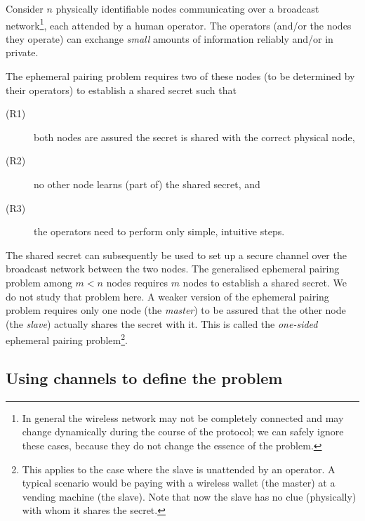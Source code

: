\documentclass[runningheads,envcountsame,envcountsect,oribibl]{llncs}
\begin{document}
Consider $n$ physically identifiable nodes communicating over a broadcast
network\footnote{
  In general the wireless network may not be completely connected and may
  change dynamically during the course of the protocol; we can safely ignore
  these cases, because they do not change the essence of the problem.
}, each attended by a human operator. The operators (and/or the nodes they
operate) can exchange \emph{small} amounts of information reliably and/or in
private. 

The ephemeral pairing problem requires
two of these nodes (to be determined by their operators) to establish a shared
secret such that 
\begin{description}
\item[(R1)] both nodes are assured the secret is shared with the correct physical
  node, 
\item[(R2)] no other node learns (part of) the shared secret, and
\item[(R3)] the operators need to perform only simple, intuitive steps.
\end{description}

The shared secret can subsequently be used to set up a secure channel over the
broadcast network between the two nodes. The generalised ephemeral pairing
problem among $m<n$ nodes requires $m$ nodes to establish a shared secret. We
do not study that problem here. A weaker version of the ephemeral pairing
problem requires only one node (the \emph{master}) to be assured that the other
node (the \emph{slave}) actually shares the secret with it. This is called the
\emph{one-sided} ephemeral pairing problem\footnote{ 
  This applies to the case where the slave is unattended by an operator. A typical
  scenario would be paying with a wireless wallet (the master) at a vending 
  machine (the slave). Note that now the slave has no clue (physically) with
  whom it shares the secret. 
}.


\subsection{Using channels to define the problem}
\end{document}
